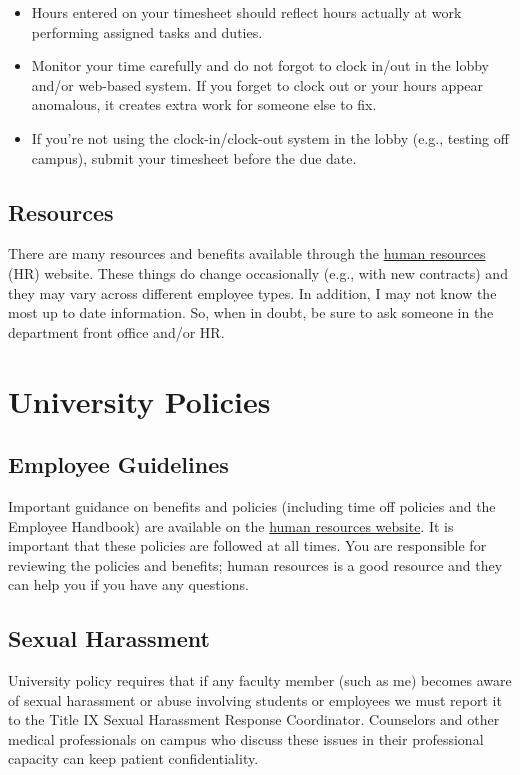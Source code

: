 \documentclass[letterpaper,11pt,oneside]{memoir}
\begin{document}
\begin{itemize}
\item Hours entered on your timesheet should reflect hours actually at work performing assigned tasks and duties.
\item Monitor your time carefully and do not forgot to clock in/out in the lobby and/or web-based system. If you forget to clock out or your hours appear anomalous, it creates extra work for someone else to fix. 
\item If you're not using the clock-in/clock-out system in the lobby (e.g., testing off campus), submit your timesheet before the due date.
\end{itemize}


\subsection{Resources}

There are many resources and benefits available through the \href{https://www.temple.edu/faculty-and-staff/working-temple/human-resources}{human resources} (HR) website. These things do change occasionally (e.g., with new contracts) and they may vary across different employee types. In addition, I may not know the most up to date information. So, when in doubt, be sure to ask someone in the department front office and/or HR. 



\section{University Policies}

\subsection{Employee Guidelines}
Important guidance on benefits and policies (including time off policies and the Employee Handbook) are available on the \href{https://www.temple.edu/faculty-and-staff/working-temple/human-resources}{human resources website}. It is important that these policies are followed at all times. You are responsible for reviewing the policies and benefits; human resources is a good resource and they can help you if you have any questions.

\subsection{Sexual Harassment}
University policy requires that if any faculty member (such as me) becomes aware of sexual harassment or abuse involving students or employees we must report it to the Title IX Sexual Harassment Response Coordinator. Counselors and other medical professionals on campus who discuss these issues in their professional capacity can keep patient confidentiality.
\end{document}
